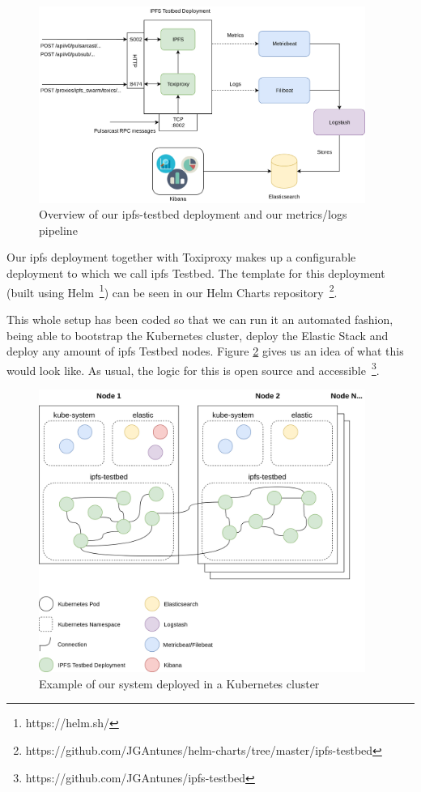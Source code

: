 \begin{figure}[!htb]
  \centering
  \includegraphics[width=0.95\textwidth]{img/ipfs-testbed-and-metrics.png}
  \caption{Overview of our ipfs-testbed deployment and our metrics/logs
  pipeline}
  \label{fig:ipfs-testbed-and-metrics}
\end{figure}

Our \acrshort{ipfs} deployment together with Toxiproxy makes up a configurable deployment
to which we call \acrshort{ipfs} Testbed. The template for this deployment (built using
Helm~\footnote{https://helm.sh/}) can be seen in our Helm Charts
repository~\footnote{https://github.com/JGAntunes/helm-charts/tree/master/ipfs-testbed}.

This whole setup has been coded so that we can run it an automated fashion,
being able to bootstrap the Kubernetes cluster, deploy the Elastic Stack and
deploy any amount of \acrshort{ipfs} Testbed nodes. Figure
\ref{fig:ipfs-testbed-kubernetes-overview} gives us an idea of what this would
look like. As usual, the logic for this is open source and
accessible~\footnote{https://github.com/JGAntunes/ipfs-testbed}.

\begin{figure}[!htb]
  \centering
  \includegraphics[width=0.95\textwidth]{img/ipfs-testbed-kubernetes-overview.png}
  \caption{Example of our system deployed in a Kubernetes cluster}
  \label{fig:ipfs-testbed-kubernetes-overview}
\end{figure}

